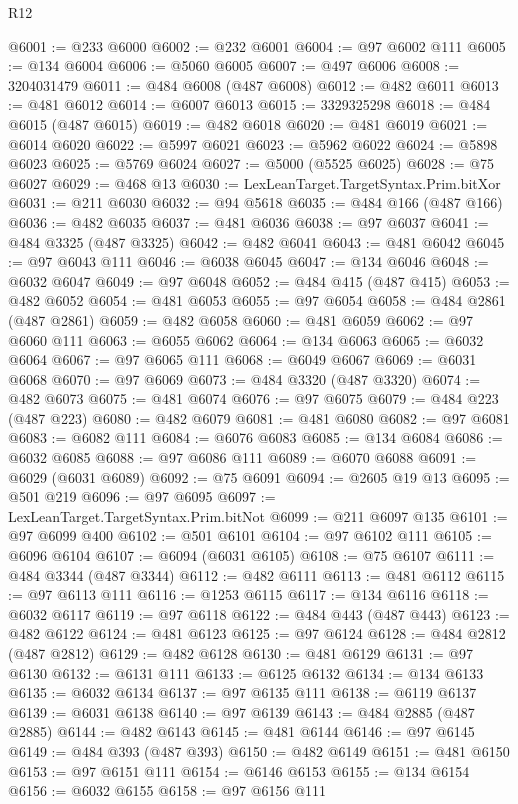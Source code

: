 \begin{lexlean}{R12}
\begin{coremodule}
{{{{{{{{{{{{{{{{{{{{{{{{{{{{{{{{{{{{{{{{{{{{{{{{{{{{{{{{{{{{{{{{{{{{{{{{{{{{{{{{{{@6001 := @233 @6000
@6002 := @232 @6001
@6004 := @97 @6002 @111
@6005 := @134 @6004
@6006 := @5060 @6005
@6007 := @497 @6006
@6008 := 3204031479
@6011 := @484 @6008 (@487 @6008)
@6012 := @482 @6011
@6013 := @481 @6012
@6014 := @6007 @6013
@6015 := 3329325298
@6018 := @484 @6015 (@487 @6015)
@6019 := @482 @6018
@6020 := @481 @6019
@6021 := @6014 @6020
@6022 := @5997 @6021
@6023 := @5962 @6022
@6024 := @5898 @6023
@6025 := @5769 @6024
@6027 := @5000 (@5525 @6025)
@6028 := @75 @6027
@6029 := @468 @13
@6030 := LexLeanTarget.TargetSyntax.Prim.bitXor
@6031 := @211 @6030
@6032 := @94 @5618
@6035 := @484 @166 (@487 @166)
@6036 := @482 @6035
@6037 := @481 @6036
@6038 := @97 @6037
@6041 := @484 @3325 (@487 @3325)
@6042 := @482 @6041
@6043 := @481 @6042
@6045 := @97 @6043 @111
@6046 := @6038 @6045
@6047 := @134 @6046
@6048 := @6032 @6047
@6049 := @97 @6048
@6052 := @484 @415 (@487 @415)
@6053 := @482 @6052
@6054 := @481 @6053
@6055 := @97 @6054
@6058 := @484 @2861 (@487 @2861)
@6059 := @482 @6058
@6060 := @481 @6059
@6062 := @97 @6060 @111
@6063 := @6055 @6062
@6064 := @134 @6063
@6065 := @6032 @6064
@6067 := @97 @6065 @111
@6068 := @6049 @6067
@6069 := @6031 @6068
@6070 := @97 @6069
@6073 := @484 @3320 (@487 @3320)
@6074 := @482 @6073
@6075 := @481 @6074
@6076 := @97 @6075
@6079 := @484 @223 (@487 @223)
@6080 := @482 @6079
@6081 := @481 @6080
@6082 := @97 @6081
@6083 := @6082 @111
@6084 := @6076 @6083
@6085 := @134 @6084
@6086 := @6032 @6085
@6088 := @97 @6086 @111
@6089 := @6070 @6088
@6091 := @6029 (@6031 @6089)
@6092 := @75 @6091
@6094 := @2605 @19 @13
@6095 := @501 @219
@6096 := @97 @6095
@6097 := LexLeanTarget.TargetSyntax.Prim.bitNot
@6099 := @211 @6097 @135
@6101 := @97 @6099 @400
@6102 := @501 @6101
@6104 := @97 @6102 @111
@6105 := @6096 @6104
@6107 := @6094 (@6031 @6105)
@6108 := @75 @6107
@6111 := @484 @3344 (@487 @3344)
@6112 := @482 @6111
@6113 := @481 @6112
@6115 := @97 @6113 @111
@6116 := @1253 @6115
@6117 := @134 @6116
@6118 := @6032 @6117
@6119 := @97 @6118
@6122 := @484 @443 (@487 @443)
@6123 := @482 @6122
@6124 := @481 @6123
@6125 := @97 @6124
@6128 := @484 @2812 (@487 @2812)
@6129 := @482 @6128
@6130 := @481 @6129
@6131 := @97 @6130
@6132 := @6131 @111
@6133 := @6125 @6132
@6134 := @134 @6133
@6135 := @6032 @6134
@6137 := @97 @6135 @111
@6138 := @6119 @6137
@6139 := @6031 @6138
@6140 := @97 @6139
@6143 := @484 @2885 (@487 @2885)
@6144 := @482 @6143
@6145 := @481 @6144
@6146 := @97 @6145
@6149 := @484 @393 (@487 @393)
@6150 := @482 @6149
@6151 := @481 @6150
@6153 := @97 @6151 @111
@6154 := @6146 @6153
@6155 := @134 @6154
@6156 := @6032 @6155
@6158 := @97 @6156 @111
}}}}}}}}}}}}}}}}}}}}}}}}}}}}}}}}}}}}}}}}}}}}}}}}}}}}}}}}}}}}}}}}}}}}}}}}}}}}}}}}}}
\end{coremodule}
\end{lexlean}
